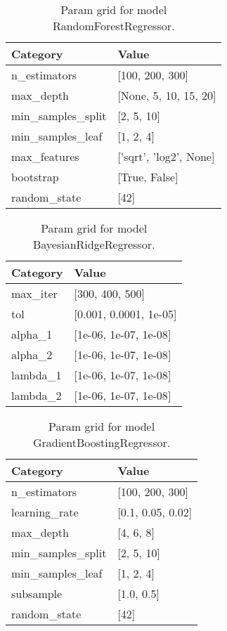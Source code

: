 \documentclass{article}%
\begin{document}
\begin{table}[H]%
\begin{center}%
\renewcommand{\arraystretch}{1.5}%
\begin{tabular}{l l}%
\hline%
\textbf{Category}&\textbf{Value}\\%
\hline%
n\_estimators&{[}100, 200, 300{]}\\%
max\_depth&{[}None, 5, 10, 15, 20{]}\\%
min\_samples\_split&{[}2, 5, 10{]}\\%
min\_samples\_leaf&{[}1, 2, 4{]}\\%
max\_features&{[}'sqrt', 'log2', None{]}\\%
bootstrap&{[}True, False{]}\\%
random\_state&{[}42{]}\\%
\hline%
\end{tabular}%
\end{center}%
\caption{Param grid for model RandomForestRegressor.}%
\end{table}

%


\begin{table}[H]%
\begin{center}%
\renewcommand{\arraystretch}{1.5}%
\begin{tabular}{l l}%
\hline%
\textbf{Category}&\textbf{Value}\\%
\hline%
max\_iter&{[}300, 400, 500{]}\\%
tol&{[}0.001, 0.0001, 1e{-}05{]}\\%
alpha\_1&{[}1e{-}06, 1e{-}07, 1e{-}08{]}\\%
alpha\_2&{[}1e{-}06, 1e{-}07, 1e{-}08{]}\\%
lambda\_1&{[}1e{-}06, 1e{-}07, 1e{-}08{]}\\%
lambda\_2&{[}1e{-}06, 1e{-}07, 1e{-}08{]}\\%
\hline%
\end{tabular}%
\end{center}%
\caption{Param grid for model BayesianRidgeRegressor.}%
\end{table}

%


\begin{table}[H]%
\begin{center}%
\renewcommand{\arraystretch}{1.5}%
\begin{tabular}{l l}%
\hline%
\textbf{Category}&\textbf{Value}\\%
\hline%
n\_estimators&{[}100, 200, 300{]}\\%
learning\_rate&{[}0.1, 0.05, 0.02{]}\\%
max\_depth&{[}4, 6, 8{]}\\%
min\_samples\_split&{[}2, 5, 10{]}\\%
min\_samples\_leaf&{[}1, 2, 4{]}\\%
subsample&{[}1.0, 0.5{]}\\%
random\_state&{[}42{]}\\%
\hline%
\end{tabular}%
\end{center}%
\caption{Param grid for model GradientBoostingRegressor.}%
\end{table}
\end{document}
